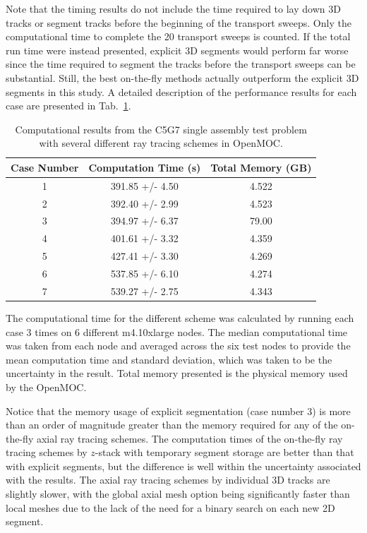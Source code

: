 Note that the timing results do not include the time required to lay down 3D tracks or segment tracks before the beginning of the transport sweeps. Only the computational time to complete the 20 transport sweeps is counted. If the total run time were instead presented, explicit 3D segments would perform far worse since the time required to segment the tracks before the transport sweeps can be substantial. Still, the best on-the-fly methods actually outperform the explicit 3D segments in this study. A detailed description of the performance results for each case are presented in Tab.~\ref{tab::performance_results}.


\begin{table}[ht]
	\centering
	\caption{Computational results from the C5G7 single assembly test problem with several different ray tracing schemes in OpenMOC.}
	\begin{tabular}{ccc}
		\toprule
		\textbf{Case Number} & \textbf{Computation Time (s)} & \textbf{Total Memory (GB)} \\
		\midrule
		1  & 391.85 +/- 4.50 & 4.522 \\
		2  & 392.40 +/- 2.99 & 4.523 \\
		3  & 394.97 +/- 6.37 & 79.00 \\
		4  & 401.61 +/- 3.32 & 4.359 \\
		5  & 427.41 +/- 3.30 & 4.269 \\
		6  & 537.85 +/- 6.10 & 4.274 \\
		7  & 539.27 +/- 2.75 & 4.343 \\
		\bottomrule
	\end{tabular}
	\label{tab::performance_results}
\end{table}


The computational time for the different scheme was calculated by running each case 3 times on 6 different m4.10xlarge nodes. The median computational time was taken from each node and averaged across the six test nodes to provide the mean computation time and standard deviation, which was taken to be the uncertainty in the result. Total memory presented is the physical memory used by the OpenMOC.

Notice that the memory usage of explicit segmentation (case number 3) is more than an order of magnitude greater than the memory required for any of the on-the-fly axial ray tracing schemes. The computation times of the on-the-fly ray tracing schemes by $z$-stack with temporary segment storage are better than that with explicit segments, but the difference is well within the uncertainty associated with the results. The axial ray tracing schemes by individual 3D tracks are slightly slower, with the global axial mesh option being significantly faster than local meshes due to the lack of the need for a binary search on each new 2D segment. 

